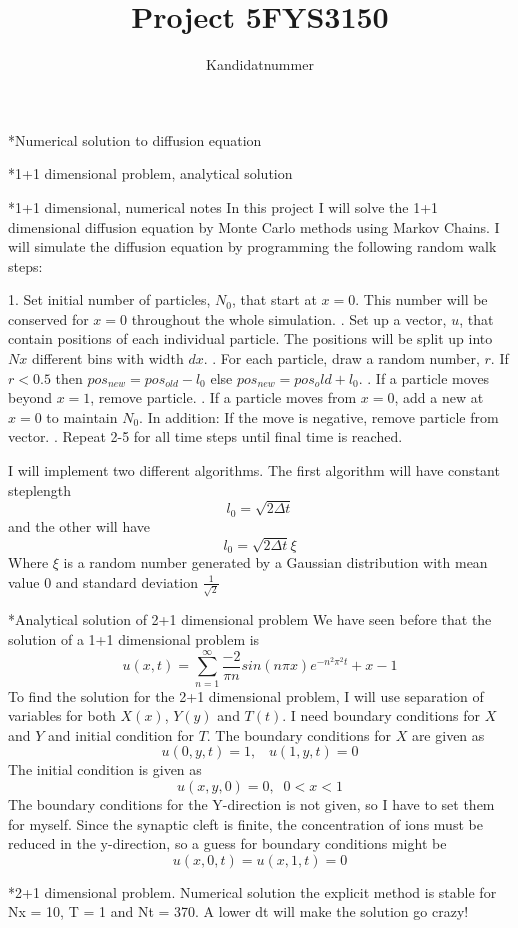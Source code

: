 \documentclass[a4paper, 12pt, titlepage]{article}
\author{Kandidatnummer }
\title{Project 5}
\title{FYS3150}
\newcommand{\f}[2]{\frac{#1}{#2}}
\newcommand{\beq}{\begin{equation*}}
\newcommand{\eeq}{\end{equation*}}
\newcommand{\n}{\newline}
\begin{document}
 \maketitle
 \newpage
 
 \begin{section}*{Numerical solution to diffusion equation}
 \end{section} 
 
 \begin{section}*{1+1 dimensional problem, analytical solution}
  
 \end{section}
  
 \begin{section}*{1+1 dimensional, numerical notes}
  In this project I will solve the 1+1 dimensional diffusion equation by Monte Carlo methods using Markov 
  Chains. I will simulate the diffusion equation by programming the following random walk steps: \par
  1. Set initial number of particles, $N_0$, that start at $x=0$. This number will be conserved for $x = 0$
  throughout the whole simulation. \n
  2. Set up a vector, $u$, that contain positions of each individual particle. The positions will be split
  up into $Nx$ different bins with width $dx$. \n
  3. For each particle, draw a random number, $r$. If $ r < 0.5 $ then $ pos_{new} = pos_{old} - l_0$
     else $pos_{new} = pos_old + l_0$. \n
  4. If a particle moves beyond $x=1$, remove particle. \n
  5. If a particle moves from $x=0$, add a new at $x=0$ to maintain $N_0$. In addition: If the move is 
     negative, remove particle from vector. \n
  6. Repeat 2-5 for all time steps until final time is reached. \par
  I will implement two different algorithms. The first algorithm will have constant steplength
  \beq l_0 = \sqrt{2\Delta t} \eeq 
  and the other will have \beq l_0 = \sqrt{2\Delta t}\xi \eeq
  Where $\xi$ is a random number generated by a Gaussian distribution with mean value $0$ and standard
  deviation $\frac{1}{\sqrt{2}}$
 \end{section}
 
 
 \begin{section}*{Analytical solution of 2+1 dimensional problem} 
  We have seen before that the solution of a 1+1 dimensional problem is 
  \beq u(x,t) = \sum_{n=1}^{\infty} \f{-2}{\pi n} sin(n\pi x) e^{-n^2\pi ^2 t} + x - 1 \eeq
  To find the solution for the 2+1 dimensional problem, I will use separation of variables for both
  $X(x)$, $Y(y)$ and $T(t)$. I need boundary conditions for $X$ and $Y$ and initial condition for $T$.
  The boundary conditions for $X$ are given as \beq u(0,y,t) = 1, \;\;\; u(1,y,t) = 0 \eeq
  The initial condition is given as
  \beq u(x,y,0) = 0, \;\; 0 < x < 1 \eeq
  The boundary conditions for the Y-direction is not given, so I have to set them for myself. Since the 
  synaptic cleft is finite, the concentration of ions must be reduced in the y-direction, so a guess for 
  boundary conditions might be \beq u(x,0,t) = u(x,1,t) = 0 \eeq
  \end{section}

  \begin{section}*{2+1 dimensional problem. Numerical solution}
  the explicit method is stable for Nx = 10, T = 1 and Nt = 370. A lower dt will make the solution go crazy! 
  \end{section}

  
\end{document}
